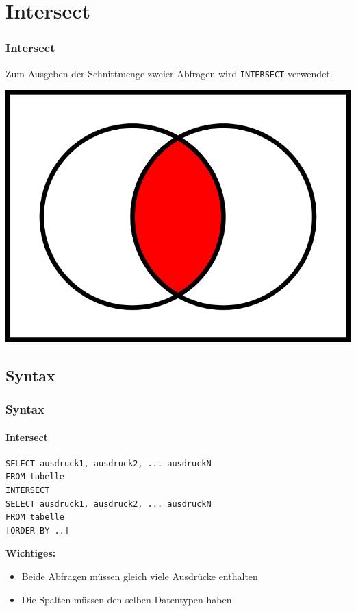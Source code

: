 \documentclass[10pt,a4paper]{beamer}
\begin{document}
\section{Intersect}
\begin{frame}
\frametitle{Intersect}
Zum Ausgeben der Schnittmenge zweier Abfragen wird \lstinline|INTERSECT| verwendet.
\begin{center}
\includegraphics[width=0.5\linewidth]{schnittmenge}
\end{center}
\end{frame}

\subsection{Syntax}
\begin{frame}[fragile]
\frametitle{Syntax}
\framesubtitle{Intersect}
\begin{lstlisting}
SELECT ausdruck1, ausdruck2, ... ausdruckN
FROM tabelle
INTERSECT	
SELECT ausdruck1, ausdruck2, ... ausdruckN
FROM tabelle
[ORDER BY ..]
\end{lstlisting}
\textbf{Wichtiges:}
\begin{itemize}
\item Beide Abfragen müssen gleich viele Ausdrücke enthalten
\item Die Spalten müssen den selben Datentypen haben 
\end{itemize}
\end{frame}
\end{document}
